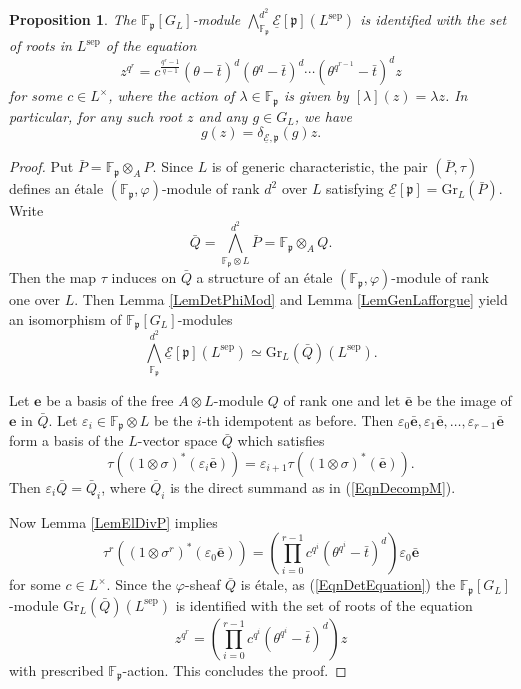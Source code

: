 \documentclass[10pt]{amsart}
\theoremstyle{plain}
\newtheorem{prop}[thm]{Proposition}
\theoremstyle{definition}
\newcommand{\sep}{\mathrm{sep}}
\newcommand{\Gr}{\mathrm{Gr}}
\newcommand{\ucE}{\underline{\mathcal{E}}}
\newcommand{\vep}{\varepsilon}
\newcommand{\bF}{\mathbb{F}}
\newcommand{\frp}{\mathfrak{p}}
\begin{document}
\begin{prop}\label{PropLafDet}
	The $\bF_\frp[G_L]$-module $\bigwedge^{d^2}_{\bF_\frp}\ucE[\frp](L^\sep)$ is identified with
	the set of roots in $L^\sep$ of the equation
	\[
	z^{q^r}=c^{\frac{q^r-1}{q-1}}(\theta-\bar{t})^d(\theta^q-\bar{t})^d\cdots (\theta^{q^{r-1}}-\bar{t})^dz
	\]
	for some $c\in L^\times$,
	where the action of $\lambda\in \bF_\frp$ is given by $[\lambda](z)=\lambda z$. 
	In particular, for any such root $z$ and any $g\in G_L$, we have
	\[
	g(z)=\delta_{\ucE,\frp}(g)z.
	\]
\end{prop}
\begin{proof}
	Put $\bar{P}=\bF_\frp\otimes_A P$. Since $L$ is of generic characteristic, 
	the pair $(\bar{P},\tau)$ defines an \'{e}tale $(\bF_\frp,\varphi)$-module of rank $d^2$ over $L$ satisfying $
	\ucE[\frp]=\Gr_L(\bar{P})$.
	Write
	\[
	\bar{Q}=\bigwedge^{d^2}_{\bF_\frp\otimes L} \bar{P}=\bF_\frp\otimes_A Q.
	\]
	Then the map $\tau$ induces on $\bar{Q}$ a structure of an \'{e}tale $(\bF_\frp,\varphi)$-module of rank one over $L$.
	Then Lemma \ref{LemDetPhiMod} and Lemma \ref{LemGenLafforgue}
	yield an isomorphism of $\bF_\frp[G_L]$-modules
	\[
	\bigwedge^{d^2}_{\bF_\frp}\ucE[\frp](L^\sep)\simeq \Gr_L(\bar{Q})(L^\sep).
	\]
	
	Let $\mathbf{e}$ be a basis of the free $A\otimes L$-module $Q$ of rank one and let $\bar{\mathbf{e}}$ be the image of $\mathbf{e}$ in $\bar{Q}$. 
	Let $\vep_i\in \bF_\frp\otimes L$ be the $i$-th idempotent as before. 
	Then $\vep_0\bar{\mathbf{e}},\vep_1\bar{\mathbf{e}},\ldots,
	\vep_{r-1}\bar{\mathbf{e}}$ form a basis of the $L$-vector space $\bar{Q}$ which satisfies
	\[
	\tau((1\otimes \sigma)^*(\vep_i\bar{\mathbf{e}}))=\vep_{i+1}\tau((1\otimes \sigma)^*(\bar{\mathbf{e}})).
	\]
	Then $\vep_i \bar{Q}=\bar{Q}_i$, where $\bar{Q}_i$ is the direct summand as in (\ref{EqnDecompM}).
	
	Now Lemma \ref{LemElDivP} implies
	\[
	\tau^r((1\otimes \sigma^r)^*(\vep_0\bar{\mathbf{e}}))=\left(\prod_{i=0}^{r-1}c^{q^i}(\theta^{q^i}-\bar{t})^d \right)\vep_0\bar{\mathbf{e}}
	\]
	for some $c\in L^\times$.
	Since the $\varphi$-sheaf $\bar{Q}$ is \'{e}tale, as (\ref{EqnDetEquation}) the $\bF_\frp[G_L]$-module $\Gr_L(\bar{Q})(L^\sep)$
	is identified with the set of roots of the equation
	\[
	z^{q^r}=\left(\prod_{i=0}^{r-1}c^{q^i}(\theta^{q^i}-\bar{t})^d \right) z
	\]
	with prescribed $\bF_\frp$-action. This concludes the proof.
\end{proof}
\end{document}
